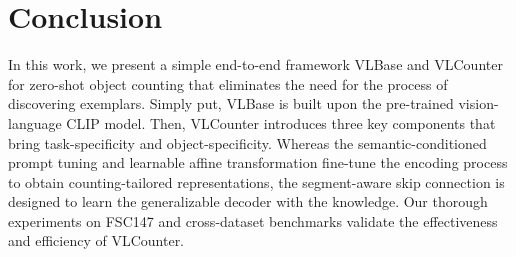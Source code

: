 \section{Conclusion}
In this work, we present a simple end-to-end framework VLBase and VLCounter for zero-shot object counting that eliminates the need for the process of discovering exemplars.
Simply put, VLBase is built upon the pre-trained vision-language CLIP model.
Then, VLCounter introduces three key components that bring task-specificity and object-specificity.
Whereas the semantic-conditioned prompt tuning and learnable affine transformation fine-tune the encoding process to obtain counting-tailored representations, the segment-aware skip connection is designed to learn the generalizable decoder with the knowledge.
Our thorough experiments on FSC147 and cross-dataset benchmarks validate the effectiveness and efficiency of VLCounter.



